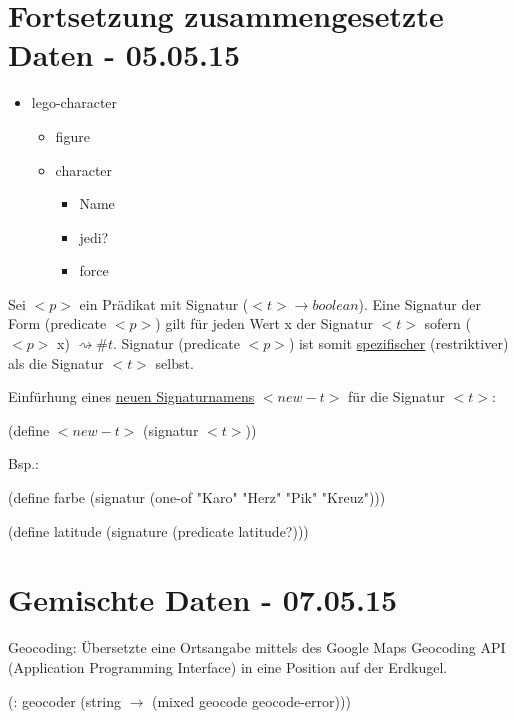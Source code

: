 \documentclass[a4paper, 20pt, openany]{book}
\begin{document}
\chapter{Fortsetzung zusammengesetzte Daten - 05.05.15}

\begin{itemize}
  \item lego-character
    \begin{itemize}
      \item figure
      \item character
        \begin{itemize}
          \item Name
          \item jedi?
          \item force
        \end{itemize}
    \end{itemize}
\end{itemize}

Sei $<p>$ ein Prädikat mit Signatur ($<t> \rightarrow boolean$). Eine Signatur der Form (predicate $<p>$) gilt für jeden Wert x der Signatur $<t>$ sofern ($<p>$ x) $\rightsquigarrow \#t$.
Signatur (predicate $<p>$) ist somit \underline{spezifischer} (restriktiver) als die Signatur $<t>$ selbst. 

Einfürhung eines \underline{neuen Signaturnamens} $<new-t>$ für die Signatur $<t>$: 

\begin{center}
  (define $<new-t>$ (signatur $<t>$))
\end{center}

Bsp.: 

\begin{center}
  (define farbe (signatur (one-of "Karo" "Herz" "Pik" "Kreuz")))
\end{center}

\begin{center}
  (define latitude (signature (predicate latitude?)))
\end{center}

\chapter{Gemischte Daten - 07.05.15}
Geocoding: Übersetzte eine Ortsangabe mittels des Google Maps Geocoding API (Application Programming Interface) in eine Position auf der Erdkugel.

\begin{center}
  (: geocoder (string $\rightarrow$ (mixed geocode geocode-error)))
\end{center}
\end{document}
